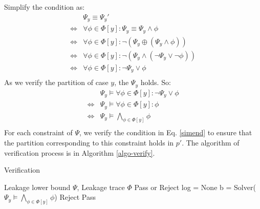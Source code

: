 Simplify the condition as:
\begin{equation}
    \begin{split}
    &\Psi_y \equiv \Psi_y' \\
    \Leftrightarrow & \forall{\phi\in \Phi[y]}: \Psi_y \equiv \Psi_y\land \phi  \\
    \Leftrightarrow & \forall{\phi\in \Phi[y]}: \neg (\Psi_y \oplus (\Psi_y\land \phi ))\\
    \Leftrightarrow & \forall{\phi\in \Phi[y]}: \neg (\Psi_y \land (\neg \Psi_y \lor \neg \phi)) \\
    \Leftrightarrow & \forall{\phi\in \Phi[y]}: \neg \Psi_y \lor \phi \\
\end{split}
\end{equation}
As we verify the partition of case $y$, the $\Psi_y$ holds. So:
\begin{equation}
    \label{simend}
    \begin{split}
    &\Psi_y \models  \forall{\phi\in \Phi[y]}: \neg \Psi_y \lor \phi \\
    \Leftrightarrow & \Psi_y \models \forall{\phi\in \Phi[y]}: \phi \\
    \Leftrightarrow & \Psi_y \models \bigwedge_{\phi\in \Phi[y]} \phi \\
\end{split}
\end{equation}
For each constraint of $\Psi$, we verify the condition in Eq. \ref{simend} to ensure that the partition corresponding to this constraint holds in $p'$.
The algorithm of verification process is in Algorithm \ref{algo-verify}.
\begin{algorithm}
    \label{algo-verify}
    \caption{Verification }
    \begin{algorithmic}
    \Require Leakage lower bound $\Psi$, Leakage trace $\Phi$
    \Ensure Pass or Reject
    \State log = None
        \State b = Solver($\Psi_y \models \bigwedge_{\phi\in \Phi[y]} \phi$)
            \State \Return Reject
        \EndIf
    \EndFor
    \State \Return Pass
    \end{algorithmic}
\end{algorithm}


